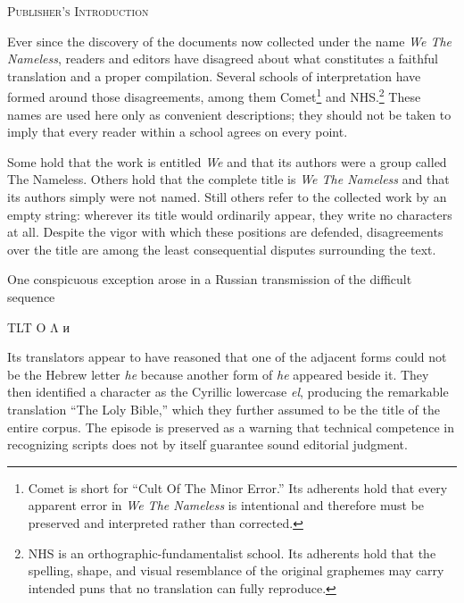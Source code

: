 \label{gen-apoc:introduction}

\begin{center}
	{\EnglishFont\large\scshape Publisher's Introduction}
\end{center}

\begingroup
\small
\sloppy

Ever since the discovery of the documents now collected under the name
\textit{We The Nameless}, readers and editors have disagreed about what
constitutes a faithful translation and a proper compilation.  Several schools
of interpretation have formed around those disagreements, among them
Comet\footnote{Comet is short for ``Cult Of The Minor Error.''  Its adherents
hold that every apparent error in \textit{We The Nameless} is intentional and
therefore must be preserved and interpreted rather than corrected.} and
NHS.\footnote{NHS is an orthographic-fundamentalist school.  Its adherents hold
that the spelling, shape, and visual resemblance of the original graphemes may
carry intended puns that no translation can fully reproduce.}  These names are
used here only as convenient descriptions; they should not be taken to imply
that every reader within a school agrees on every point.

Some hold that the work is entitled \textit{We} and that its authors were a
group called The Nameless.  Others hold that the complete title is
\textit{We The Nameless} and that its authors simply were not named.  Still
others refer to the collected work by an empty string: wherever its title
would ordinarily appear, they write no characters at all.  Despite the vigor
with which these positions are defended, disagreements over the title are
among the least consequential disputes surrounding the text.

One conspicuous exception arose in a Russian transmission of the difficult
sequence

\begin{center}
	\textdir TLT
	\mbox{} \mbox{} O Λ  
	\mbox{} {\CyrillicFont и} 
	\mbox{} \mbox{}
\end{center}

Its translators appear to have reasoned that one of the adjacent forms could
not be the Hebrew letter \textit{he} because another form of \textit{he}
appeared beside it.  They then identified a character as the Cyrillic
lowercase \textit{el}, producing the remarkable translation
``The Loly Bible,'' which they further assumed to be the title of the entire
corpus.  The episode is preserved as a warning that technical competence in
recognizing scripts does not by itself guarantee sound editorial judgment.

